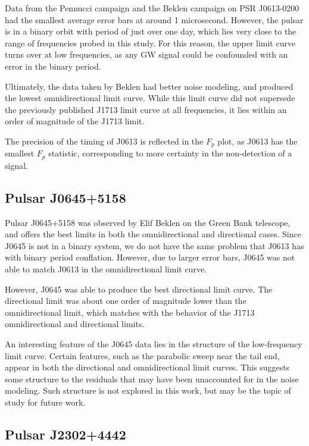 \documentclass[12pt]{article}
\begin{document}
Data from the Pennucci campaign and the Beklen campaign on PSR J0613-0200 had the
smallest average error bars at around 1 microsecond. However, the pulsar is in a
binary orbit with period of just over one day, which lies very close to the
range of frequencies probed in this study. For this reason, the upper limit
curve turns over at low frequencies, as any GW signal could be confounded with
an error in the binary period.

Ultimately, the data taken by Beklen had better noise modeling, and produced the
lowest omnidirectional limit curve. While this limit curve did not supersede the
previously published J1713 limit curve at all frequencies, it lies within an
order of magnitude of the J1713 limit.

The precision of the timing of J0613 is reflected in the $F_p$ plot, as J0613
has the smallest $F_p$ statistic, corresponding to more certainty in the
non-detection of a signal.

\subsection{Pulsar J0645+5158}

Pulsar J0645+5158 was observed by Elif Beklen on the Green Bank telescope, and
offers the best limits in both the omnidirectional and directional cases. Since
J0645 is not in a binary system, we do not have the same problem that J0613 has
with binary period conflation. However, due to larger error bars, J0645 was not
able to match J0613 in the omnidirectional limit curve.

However, J0645 was able to produce the best directional limit curve. The
directional limit was about one order of magnitude lower than the
omnidirectional limit, which matches with the behavior of the J1713
omnidirectional and directional limits. 

An interesting feature of the J0645 data lies in the structure of the
low-frequency limit curve. Certain features, such as the parabolic sweep near
the tail end, appear in both the directional and omnidirectional limit curves.
This suggests some structure to the residuals that may have been unaccounted for
in the noise modeling. Such structure is not explored in this work, but may be
the topic of study for future work.


\subsection{Pulsar J2302+4442}
\end{document}

